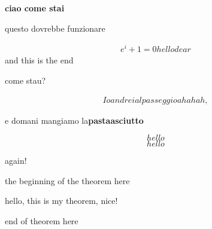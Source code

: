 \textbf{ciao come stai}

questo dovrebbe funzionare

\begin{align*}
e^i+1=0 hello dear
\end{align*}
and this is the end

come stau?

\begin{align}
Io andrei al passeggio ahahah,
\end{align}

e domani mangiamo la\textbf{pastaasciutto}

\begin{equation} hello \end{equation}
\begin{equation*} hello \end{equation*}

again!

the beginning of the theorem here
\begin{theorem}
hello, this is my theorem, nice!
\end{theorem}
end of theorem here
